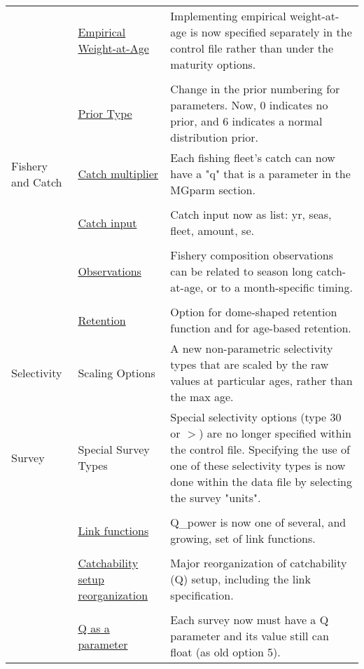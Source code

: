 \begin{center}
\begin{longtable}{p{2cm} p{3cm} p{10cm}}
				  \\
				  & \hyperlink{WAAparm} {Empirical Weight-at-Age} & Implementing empirical weight-at-age is now specified separately in the control file rather than under the maturity options.\\
				  \\
				  & \hyperlink{Priors}{Prior Type} & Change in the prior numbering for parameters.  Now, 0 indicates no prior, and 6 indicates a normal distribution prior.\\
				\hline
				Fishery and Catch & 
					\hyperlink{CatchMult}{Catch multiplier} & 
						Each fishing fleet's catch can now have a "q" that is a parameter in the MGparm section.\\
				  \\						
					& \hyperlink{CatchFormat}{Catch input} & 
						Catch input now as list:  yr, seas, fleet, amount, se. \\
				  \\						
					& \hyperlink{CompTiming}{Observations} & 
						Fishery composition observations can be related to season long catch-at-age, or to a month-specific timing.\\
				  \\					
					& \hyperlink{DomeRetention}{Retention} & 
						Option for dome-shaped retention function and for age-based retention. \\
				\hline
				Selectivity 
					& Scaling Options& 	
						A new non-parametric selectivity types that are scaled by the raw values at particular ages, rather than the max age.\\
				Survey
					& Special Survey Types & 
						Special selectivity options (type 30 or $>$) are no longer specified within the control file.  Specifying the use of one of these selectivity types is now done within the data file by selecting the survey "units". \\  
				  \\
					& \hyperlink{Qsetup}{Link functions} & 
						Q\_power is now one of several, and growing, set of link functions. \\
				  \\						
					& \hyperlink{Qsetup}{Catchability setup reorganization} & 
						Major reorganization of catchability (Q) setup, including the link specification. \\
				  \\					
					& \multicolumn{1}{l}{\hyperlink{Qsetup}{Q as a parameter}} & 
						Each survey now must have a Q parameter and its value still can float (as old option 5).\\

\end{longtable}
\end{center}

